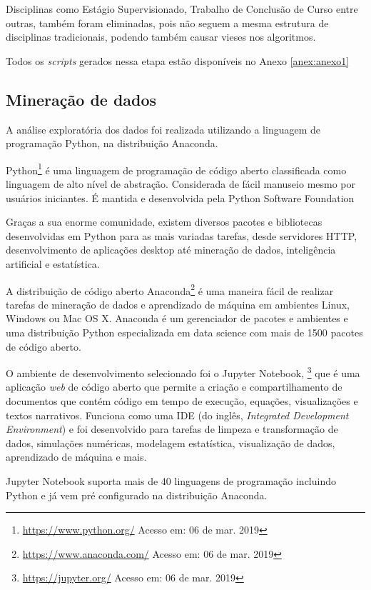 Disciplinas como Estágio Supervisionado, Trabalho de Conclusão de Curso entre outras,
também foram eliminadas, pois não seguem a mesma estrutura de disciplinas tradicionais,
podendo também causar vieses nos algoritmos.

Todos os \textit{scripts} gerados nessa etapa estão disponíveis no Anexo
\ref{anex:anexo1}

\subsection{Mineração de dados}

A análise exploratória dos dados foi realizada utilizando a
linguagem de programação Python, na distribuição Anaconda.

Python\footnote{\url{https://www.python.org/} Acesso em: 06 de mar. 2019} é uma
linguagem de programação de código aberto classificada como linguagem de alto
nível de abstração. Considerada de fácil manuseio mesmo por usuários iniciantes.
É mantida e desenvolvida pela Python Software Foundation

Graças a sua enorme comunidade, existem diversos pacotes e bibliotecas
desenvolvidas em Python para as mais variadas tarefas, desde servidores HTTP,
desenvolvimento de aplicações desktop até mineração de dados, inteligência
artificial e estatística.

A distribuição de código aberto
Anaconda\footnote{\url{https://www.anaconda.com/} Acesso em: 06 de mar. 2019}  é
uma maneira fácil de realizar tarefas de mineração de dados e aprendizado de
máquina em ambientes Linux, Windows ou Mac OS X. Anaconda é um gerenciador de
pacotes e ambientes e uma distribuição Python especializada em data science com
mais de 1500 pacotes de código aberto.

O ambiente de desenvolvimento selecionado foi o Jupyter Notebook, \footnote{\url{https://jupyter.org/} Acesso em: 06 de mar. 2019}
que é uma aplicação \textit{web} de código aberto que permite a criação e
compartilhamento de documentos que contém código em tempo de execução, equações,
visualizações e textos narrativos. Funciona como uma IDE (do inglês,
\textit{Integrated Development Environment}) e foi desenvolvido para tarefas de
limpeza e transformação de dados, simulações numéricas, modelagem estatística,
visualização de dados, aprendizado de máquina e mais.

Jupyter Notebook suporta mais de 40 linguagens de programação incluindo Python e
já vem pré configurado na distribuição Anaconda.

